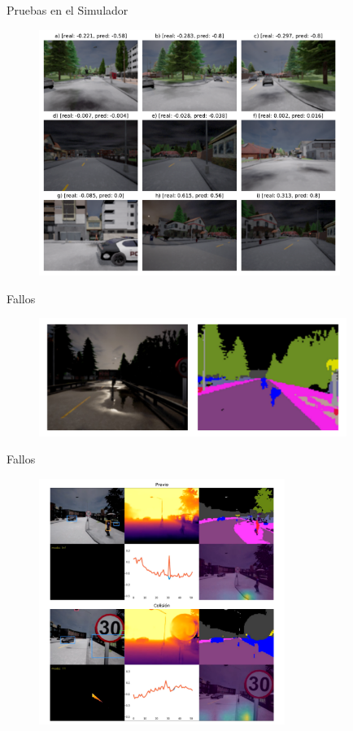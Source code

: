 \documentclass[10pt, usepdftitle=false]{beamer}
\begin{document}
\begin{frame}[fragile]{Pruebas en el Simulador}
	\begin{figure}[H]
		\captionsetup{labelformat=empty}
		\centering
		\includegraphics[height=8cm]{imagenes/preds/steer}
	\end{figure}
\end{frame}

\begin{frame}[fragile]{Fallos}
	\begin{figure}[H]
		\captionsetup{labelformat=empty}
		\centering
		\includegraphics[width=10cm]{imagenes/preds/err1}
	\end{figure}
\end{frame}

\begin{frame}[fragile]{Fallos}
	\begin{figure}[H]
		\captionsetup{labelformat=empty}
		\centering
		\includegraphics[height=8cm]{imagenes/preds/err2}
	\end{figure}
\end{frame}
\end{document}
